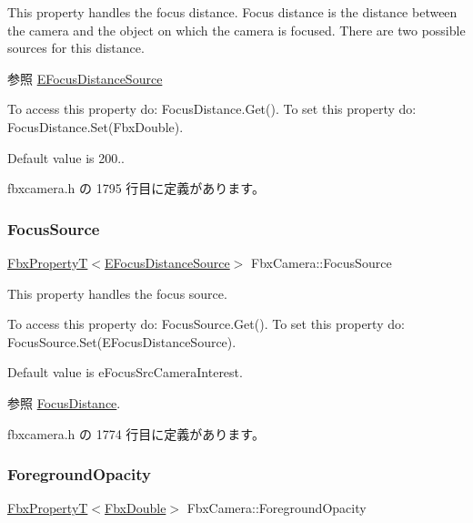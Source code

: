 This property handles the focus distance. Focus distance is the distance between the camera and the object on which the camera is focused. There are two possible sources for this distance. \begin{DoxySeeAlso}{参照}
\hyperlink{class_fbx_camera_a1b50e7b2953019a40328599679071ad4}{E\+Focus\+Distance\+Source}
\end{DoxySeeAlso}
To access this property do\+: Focus\+Distance.\+Get(). To set this property do\+: Focus\+Distance.\+Set(\+Fbx\+Double).

Default value is 200.. 

 fbxcamera.\+h の 1795 行目に定義があります。

\mbox{\label{class_fbx_camera_a17f0c0c82ed8df4540d918567edcbd4a}} 
\subsubsection{\texorpdfstring{Focus\+Source}{FocusSource}}
{\footnotesize\ttfamily \hyperlink{class_fbx_property_t}{Fbx\+PropertyT}$<$\hyperlink{class_fbx_camera_a1b50e7b2953019a40328599679071ad4}{E\+Focus\+Distance\+Source}$>$ Fbx\+Camera\+::\+Focus\+Source}

This property handles the focus source.

To access this property do\+: Focus\+Source.\+Get(). To set this property do\+: Focus\+Source.\+Set(\+E\+Focus\+Distance\+Source).

Default value is e\+Focus\+Src\+Camera\+Interest. \begin{DoxySeeAlso}{参照}
\hyperlink{class_fbx_camera_af6165df26c7d25156163a3ed2a2f99c2}{Focus\+Distance}. 
\end{DoxySeeAlso}


 fbxcamera.\+h の 1774 行目に定義があります。

\mbox{\label{class_fbx_camera_a95fe1a3dbd71e2503e7f4de5f14ea171}} 
\subsubsection{\texorpdfstring{Foreground\+Opacity}{ForegroundOpacity}}
{\footnotesize\ttfamily \hyperlink{class_fbx_property_t}{Fbx\+PropertyT}$<$\hyperlink{fbxtypes_8h_a171e72a1c46fc15c1a6c9c31948c1c5b}{Fbx\+Double}$>$ Fbx\+Camera\+::\+Foreground\+Opacity}

